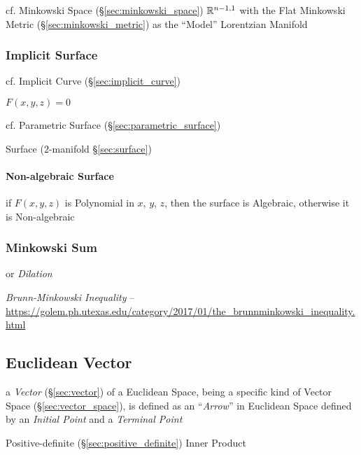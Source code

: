 cf. Minkowski Space (\S\ref{sec:minkowski_space}) $\mathbb{R}^{n-1,1}$
with the Flat Minkowski Metric (\S\ref{sec:minkowski_metric}) as the
``Model'' Lorentzian Manifold



\subsubsection{Implicit Surface}\label{sec:implicit_surface}

\fist cf. Implicit Curve (\S\ref{sec:implicit_curve})

$F(x,y,z) = 0$

\fist cf. Parametric Surface (\S\ref{sec:parametric_surface})

\fist Surface ($2$-manifold \S\ref{sec:surface})



\paragraph{Non-algebraic Surface}\label{sec:nonalgebraic_surface}\hfill

if $F(x,y,z)$ is Polynomial in $x$, $y$, $z$, then the surface is
Algebraic, otherwise it is Non-algebraic



\subsubsection{Minkowski Sum}\label{sec:minkowski_sum}

or \emph{Dilation}

\emph{Brunn-Minkowski Inequality} --
\url{https://golem.ph.utexas.edu/category/2017/01/the_brunnminkowski_inequality.html}



\subsection{Euclidean Vector}\label{sec:euclidean_vector}

a \emph{Vector} (\S\ref{sec:vector}) of a Euclidean Space, being a specific
kind of Vector Space (\S\ref{sec:vector_space}), is defined as an
``\emph{Arrow}'' in Euclidean Space defined by an \emph{Initial Point} and a
\emph{Terminal Point}

Positive-definite (\S\ref{sec:positive_definite}) Inner Product



